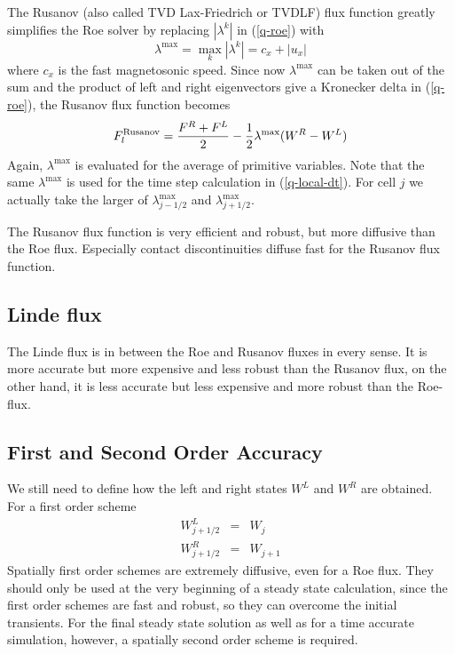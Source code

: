 The Rusanov (also called TVD Lax-Friedrich or TVDLF) flux function greatly
simplifies the Roe solver by replacing $|\lambda^k|$ in (\ref{q-roe}) with 
\begin{equation}
\lambda^{\max}=\max_k |\lambda^k| = c_x + |u_x|
\end{equation}
where $c_x$ is the fast magnetosonic speed. Since now $\lambda^{\max}$ 
can be taken out of the sum and the product of left and right eigenvectors 
give a Kronecker delta in (\ref{q-roe}), the Rusanov flux function becomes
\begin{equation}
   F^{\rm Rusanov}_l = 
      \frac{F^R+F^L}{2} - \frac12 \lambda^{\max} (W^R-W^L)
\label{q-rusanov}
\end{equation}
Again, $\lambda^{\max}$ is evaluated for the average of primitive variables.
Note that the same $\lambda^{\max}$ is used for the time step calculation 
in (\ref{q-local-dt}). For cell $j$ we actually take the larger of
$\lambda_{j-1/2}^{\max}$ and $\lambda_{j+1/2}^{\max}$.

The Rusanov flux function is very efficient and robust, but more diffusive
than the Roe flux. Especially contact discontinuities diffuse fast for the
Rusanov flux function.

\subsection{Linde flux \label{section:linde}}

The Linde flux is in between the Roe and Rusanov fluxes in every sense.
It is more accurate but more expensive and less robust than the Rusanov flux, 
on the other hand, it is less accurate but less expensive and more robust
than the Roe-flux.

\subsection{First and Second Order Accuracy \label{section:order_accuracy}}

We still need to define how the left and right states $W^L$ and $W^R$ are
obtained. For a first order scheme
\begin{eqnarray}
W_{j+1/2}^L&=&W_{j}     \nonumber\\
W_{j+1/2}^R&=&W_{j+1}   \label{q-LR-first-order}
\end{eqnarray}
Spatially first order schemes are extremely diffusive, even for a Roe flux.
They should only be used at the very beginning of a steady state calculation,
since the first order schemes are fast and robust, so they can overcome
the initial transients. For the final steady state solution as well
as for a time accurate simulation, however, a spatially second order scheme 
is required. 

